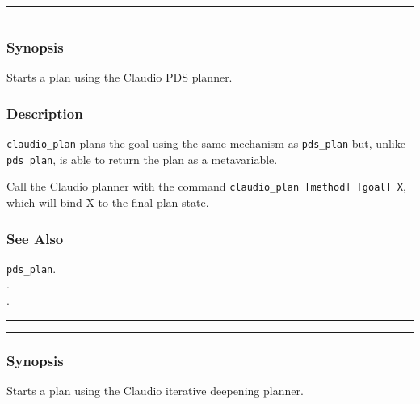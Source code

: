 \vspace{2mm}
\hrule
\vspace{2mm}
\begin{Large}
\end{Large}
\vspace{2mm}
\hrule
\vspace{2mm}


\subsubsection*{Synopsis}
Starts a plan using the Claudio PDS planner.

\subsubsection*{Description}
{\tt claudio\_plan} plans the goal using the same mechanism as {\tt pds\_plan} but, unlike {\tt pds\_plan}, is able to return the plan as a metavariable.

\noindent Call the Claudio planner with the command
\texttt{claudio\_plan [method] [goal] X}, which will bind X to the
final plan state.

\subsubsection*{See Also}
{\tt pds\_plan}. \\
. \\
. \\

\vspace{2mm}
\hrule
\vspace{2mm}
\begin{Large}
\end{Large}
\vspace{2mm}
\hrule
\vspace{2mm}


\subsubsection*{Synopsis}
Starts a plan using the Claudio iterative deepening planner.

